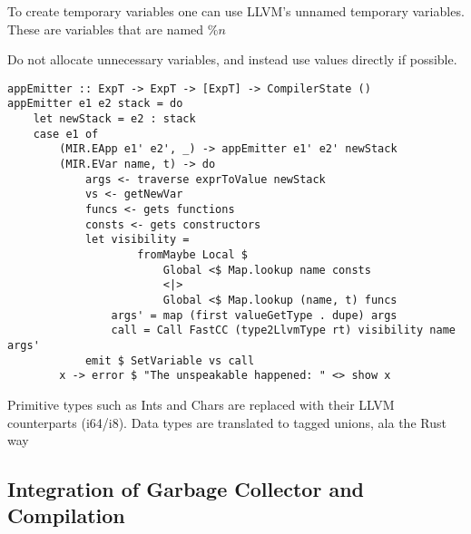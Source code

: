 To create temporary variables one can use LLVM's unnamed temporary variables.
These are variables that are named $\%n$

Do not allocate unnecessary variables, and instead use values directly if possible.

\begin{verbatim}
appEmitter :: ExpT -> ExpT -> [ExpT] -> CompilerState ()
appEmitter e1 e2 stack = do
    let newStack = e2 : stack
    case e1 of
        (MIR.EApp e1' e2', _) -> appEmitter e1' e2' newStack
        (MIR.EVar name, t) -> do
            args <- traverse exprToValue newStack
            vs <- getNewVar
            funcs <- gets functions
            consts <- gets constructors
            let visibility =
                    fromMaybe Local $
                        Global <$ Map.lookup name consts
                        <|>
                        Global <$ Map.lookup (name, t) funcs
                args' = map (first valueGetType . dupe) args
                call = Call FastCC (type2LlvmType rt) visibility name args'
            emit $ SetVariable vs call
        x -> error $ "The unspeakable happened: " <> show x
\end{verbatim}
Primitive types such as Ints and Chars are replaced with their LLVM counterparts (i64/i8). 
Data types are translated to tagged unions, ala the Rust way
\subsection{Integration of Garbage Collector and Compilation}
